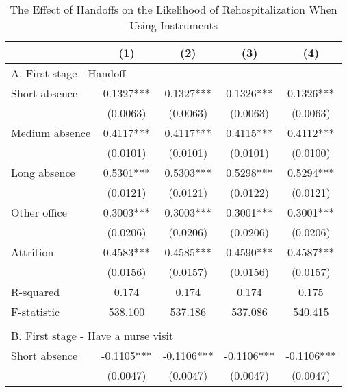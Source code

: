 \documentclass[final,12pt, notitlepage]{article}
\begin{document}
\begin{singlespace}
\begin{table}[H]
\footnotesize
\setlength\tabcolsep{0pt}
\centering
\caption{The Effect of Handoffs on the Likelihood of Rehospitalization When Using Instruments}
\label{tab:iv}
\begin{threeparttable}
{
\def\sym#1{\ifmmode^{#1}\else\(^{#1}\)\fi}
\begin{tabular*}{\textwidth}{l@{\extracolsep{\fill}}*{4}{c}} %
\toprule
                    &\multicolumn{1}{c}{(1)}&\multicolumn{1}{c}{(2)}&\multicolumn{1}{c}{(3)}&\multicolumn{1}{c}{(4)}\\
\midrule
\multicolumn{5}{l}{A. First stage - Handoff} \\
Short absence       &      0.1327***&      0.1327***&      0.1326***&      0.1326***\\
                    &    (0.0063)   &    (0.0063)   &    (0.0063)   &    (0.0063)   \\
Medium absence      &      0.4117***&      0.4117***&      0.4115***&      0.4112***\\
                    &    (0.0101)   &    (0.0101)   &    (0.0101)   &    (0.0100)   \\
Long absence        &      0.5301***&      0.5303***&      0.5298***&      0.5294***\\
                    &    (0.0121)   &    (0.0121)   &    (0.0122)   &    (0.0121)   \\
Other office        &      0.3003***&      0.3003***&      0.3001***&      0.3001***\\
                    &    (0.0206)   &    (0.0206)   &    (0.0206)   &    (0.0206)   \\
Attrition           &      0.4583***&      0.4585***&      0.4590***&      0.4587***\\
                    &    (0.0156)   &    (0.0157)   &    (0.0156)   &    (0.0157)   \\
R-squared           &       0.174   &       0.174   &       0.174   &       0.175   \\
F-statistic         &     538.100   &     537.186   &     537.086   &     540.415   \\
\\
\multicolumn{5}{l}{B. First stage - Have a nurse visit} \\
Short absence       &     -0.1105***&     -0.1106***&     -0.1106***&     -0.1106***\\
                    &    (0.0047)   &    (0.0047)   &    (0.0047)   &    (0.0047)   \\

\end{tabular*}}
\end{threeparttable}
\end{table}
\end{singlespace}
\end{document}
